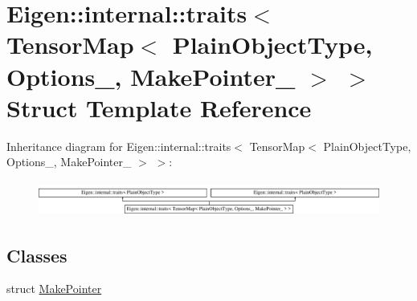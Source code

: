 \hypertarget{struct_eigen_1_1internal_1_1traits_3_01_tensor_map_3_01_plain_object_type_00_01_options___00_01_make_pointer___01_4_01_4}{}\section{Eigen\+:\+:internal\+:\+:traits$<$ Tensor\+Map$<$ Plain\+Object\+Type, Options\+\_\+, Make\+Pointer\+\_\+ $>$ $>$ Struct Template Reference}
\label{struct_eigen_1_1internal_1_1traits_3_01_tensor_map_3_01_plain_object_type_00_01_options___00_01_make_pointer___01_4_01_4}
Inheritance diagram for Eigen\+:\+:internal\+:\+:traits$<$ Tensor\+Map$<$ Plain\+Object\+Type, Options\+\_\+, Make\+Pointer\+\_\+ $>$ $>$\+:\begin{figure}[H]
\begin{center}
\leavevmode
\includegraphics[height=1.157025cm]{struct_eigen_1_1internal_1_1traits_3_01_tensor_map_3_01_plain_object_type_00_01_options___00_01_make_pointer___01_4_01_4}
\end{center}
\end{figure}
\subsection*{Classes}
\begin{DoxyCompactItemize}
\item 
struct \hyperlink{struct_eigen_1_1internal_1_1traits_3_01_tensor_map_3_01_plain_object_type_00_01_options___00_01_2ffe711dc868f2af95478b5bf448510f}{Make\+Pointer}
\end{DoxyCompactItemize}

